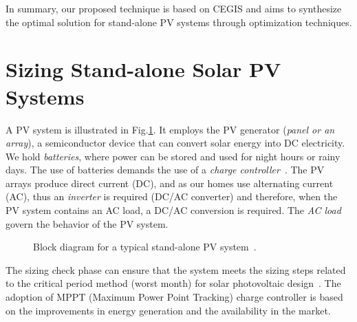 \documentclass[review]{elsarticle}
\begin{document}
In summary, our proposed technique is based on CEGIS and aims to synthesize the optimal solution for stand-alone PV systems through optimization techniques.

\section{Sizing Stand-alone Solar PV Systems}
\label{sec:sizing}
A PV system is illustrated in Fig.\ref{fig:blockdiagram}. It employs the PV generator (\textit{panel or an array}), a semiconductor device that can convert solar energy into DC electricity. We hold \textit{batteries}, where power can be stored and used for night hours or rainy days. The use of batteries demands the use of a \textit{charge controller}~\citep{Hansen}. The PV arrays produce direct current (DC), and as our homes use alternating current (AC), thus an \textit{inverter} is required (DC/AC converter) and therefore, when the PV system contains an AC load, a DC/AC conversion is required. The \textit{AC load} govern the behavior of the PV system.
%
\begin{figure}[ht]
\centering
\caption{Block diagram for a typical stand-alone PV system~\citep{Hansen}.}
\label{fig:blockdiagram} 
\end{figure}
 
The sizing check phase can ensure that the system meets the sizing steps related to the critical period method (worst month) for solar photovoltaic design~\citep{Pinho}. The adoption of MPPT (Maximum Power Point Tracking) charge controller is based on the improvements in energy generation and the availability in the market. 
 
\end{document}

